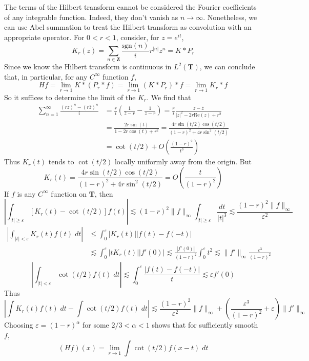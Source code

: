 The terms of the Hilbert transform cannot be considered the Fourier coefficients of any integrable function. Indeed, they don't vanish as $n \to \infty$. Nonetheless, we can use Abel summation to treat the Hilbert transform as convolution with an appropriate operator. For $0 < r < 1$, consider, for $z = e^{it}$,
%
\[ K_r(z) = \sum_{n \in \mathbf{Z}} \frac{\text{sgn}(n)}{i} r^{|n|} z^n = K * P_r \]
%
Since we know the Hilbert transform is continuous in $L^2(\mathbf{T})$, we can conclude that, in particular, for any $C^\infty$ function $f$,
%
\[ H f = \lim_{r \to 1} K * (P_r * f) = \lim_{r \to 1} (K * P_r) * f = \lim_{r \to 1} K_r * f \]
%
So it suffices to determine the limit of the $K_r$. We find that
%
\begin{align*}
	\sum_{n = 1}^\infty \frac{(rz)^n - (r \overline{z})^n}{i} &= \frac{r}{i} \left( \frac{1}{\overline{z} - r} - \frac{1}{z - r} \right) = \frac{r}{i} \frac{z - \overline{z}}{|z|^2 - 2r \text{Re}(z) + r^2}\\
	&= \frac{2r \sin(t)}{1 - 2r \cos(t) + r^2} = \frac{4r \sin(t/2) \cos(t/2)}{(1 - r)^2 + 4r \sin^2(t/2)}\\
	&= \cot(t/2) + O \left( \frac{(1 - r)^2}{t^3} \right)
\end{align*}
%
Thus $K_r(t)$ tends to $\cot(t/2)$ locally uniformly away from the origin. But
%
\[ K_r(t) = \frac{4r \sin(t/2) \cos(t/2)}{(1 - r)^2 + 4r\sin^2(t/2)} = O \left( \frac{t}{(1 - r)^2} \right) \]
%
If $f$ is any $C^\infty$ function on $\mathbf{T}$, then
%
\[ \left| \int_{|t| \geq \varepsilon} [K_r(t) - \cot(t/2)] f(t) \right| \lesssim (1 - r)^2 \| f \|_\infty \int_{|t| \geq \varepsilon} \frac{dt}{|t|^3} \lesssim \frac{(1 - r)^2 \| f \|_\infty}{\varepsilon^2} \]
%
\begin{align*}
	\left| \int_{|t| < \varepsilon} K_r(t) f(t)\; dt \right| &\leq \int_0^\varepsilon |K_r(t)||f(t) - f(-t)|\\
	&\lesssim \int_0^\varepsilon |tK_r(t)||f'(0)| \lesssim \frac{|f'(0)|}{(1 - r)^2} \int_0^\varepsilon t^2 \lesssim \| f' \|_\infty \frac{\varepsilon^3}{(1 - r)^2}
\end{align*}
%
\[ \left| \int_{|t| < \varepsilon} \cot(t/2) f(t)\; dt \right| \lesssim \int_0^\varepsilon \frac{|f(t) - f(-t)|}{t} \lesssim \varepsilon f'(0) \]
%
Thus
%
\[ \left| \int K_r(t) f(t)\; dt - \int \cot(t/2) f(t)\; dt \right| \lesssim \frac{(1 - r)^2}{\varepsilon^2} \| f \|_\infty + \left( \frac{\varepsilon^3}{(1 - r)^2} + \varepsilon \right) \| f' \|_\infty \]
%
Choosing $\varepsilon = (1 - r)^\alpha$ for some $2/3 < \alpha < 1$ shows that for sufficiently smooth $f$,
%
\[ (Hf)(x) = \lim_{r \to 1} \int \cot(t/2) f(x - t)\; dt \]


